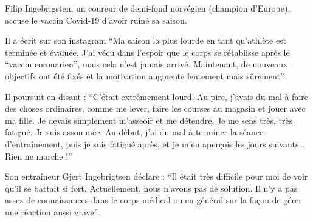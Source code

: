 Filip Ingebrigsten, un coureur de demi-fond norvégien (champion d'Europe),
accuse le vaccin Covid-19 d'avoir ruiné sa saison.

Il a écrit sur son instagram “Ma saison la plus lourde en tant qu'athlète est
terminée et évaluée. J'ai vécu dans l'espoir que le corps se rétablisse après le
“vaccin coronarien”, mais cela n'est jamais arrivé. Maintenant, de nouveaux
objectifs ont été fixés et la motivation augmente lentement mais sûrement”.

Il poursuit en disant : “C'était extrêmement lourd. Au pire, j'avais du mal à
faire des choses ordinaires, comme me lever, faire les courses au magasin et
jouer avec ma fille. Je devais simplement m'asseoir et me détendre. Je me sens
très, très fatigué. Je suis assommée. Au début, j'ai du mal à terminer la séance
d'entraînement, puis je suis fatigué après, et je m'en aperçois les jours
suivants… Rien ne marche !”

Son entraîneur Gjert Ingebrigtsen déclare : “Il était très difficile pour moi de
voir qu'il se battait si fort. Actuellement, nous n'avons pas de solution. Il
n'y a pas assez de connaissances dans le corps médical ou en général sur la
façon de gérer une réaction aussi grave”.
